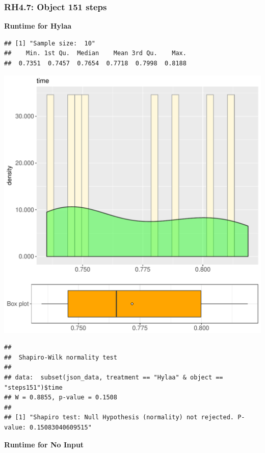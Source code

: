 \documentclass{article}\usepackage[]{graphicx}\usepackage[]{color}
\makeatletter
\def\maxwidth{ %
  \ifdim\Gin@nat@width>\linewidth
    \linewidth
  \else
    \Gin@nat@width
  \fi
}
\newenvironment{kframe}{%
 \def\at@end@of@kframe{}%
 \ifinner\ifhmode%
  \def\at@end@of@kframe{\end{minipage}}%
  \begin{minipage}{\columnwidth}%
 \fi\fi%
 \def\FrameCommand##1{\hskip\@totalleftmargin \hskip-\fboxsep
 \colorbox{shadecolor}{##1}\hskip-\fboxsep
     \hskip-\linewidth \hskip-\@totalleftmargin \hskip\columnwidth}%
 \MakeFramed {\advance\hsize-\width
   \@totalleftmargin\z@ \linewidth\hsize
   \@setminipage}}%
 {\par\unskip\endMakeFramed%
 \at@end@of@kframe}
\newenvironment{knitrout}{}{} %
\makeatother
\begin{document}
\subsubsection{RH4.7: Object 151 steps}

 \textbf{Runtime for Hylaa}
\begin{knitrout}
\color{fgcolor}\begin{kframe}
\begin{verbatim}
## [1] "Sample size:  10"
##    Min. 1st Qu.  Median    Mean 3rd Qu.    Max. 
##  0.7351  0.7457  0.7654  0.7718  0.7998  0.8188
\end{verbatim}
\end{kframe}
\includegraphics[width=\maxwidth]{figure/RH4_Hylaa_steps151-1} 
\begin{kframe}\begin{verbatim}
## 
## 	Shapiro-Wilk normality test
## 
## data:  subset(json_data, treatment == "Hylaa" & object == "steps151")$time
## W = 0.8855, p-value = 0.1508
## 
## [1] "Shapiro test: Null Hypothesis (normality) not rejected. P-value: 0.15083040609515"
\end{verbatim}
\end{kframe}
\end{knitrout}
 \textbf{Runtime for No Input}
\end{document}
